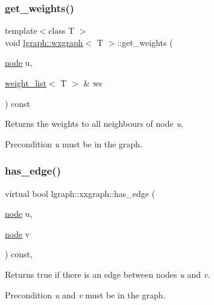 \subsubsection{\texorpdfstring{get\+\_\+weights()}{get\_weights()}\hspace{0.1cm}{\footnotesize\ttfamily [2/2]}}
{\footnotesize\ttfamily template$<$class T $>$ \\
void \hyperlink{classlgraph_1_1wxgraph}{lgraph\+::wxgraph}$<$ T $>$\+::get\+\_\+weights (\begin{DoxyParamCaption}\item[{\hyperlink{namespacelgraph_a397169dd66adf725210a30fb7251773e}{node}}]{u,  }\item[{\hyperlink{namespacelgraph_a1e0fd5ef0a78b2a92da48adbed265cb6}{weight\+\_\+list}$<$ T $>$ \&}]{ws }\end{DoxyParamCaption}) const}



Returns the weights to all neighbours of node {\itshape u}. 

\begin{DoxyPrecond}{Precondition}
{\itshape u} must be in the graph. 
\end{DoxyPrecond}
\mbox{\label{classlgraph_1_1xxgraph_a4e36e9722df020df6ba1dc47b7d9d830}} 
\subsubsection{\texorpdfstring{has\+\_\+edge()}{has\_edge()}}
{\footnotesize\ttfamily virtual bool lgraph\+::xxgraph\+::has\+\_\+edge (\begin{DoxyParamCaption}\item[{\hyperlink{namespacelgraph_a397169dd66adf725210a30fb7251773e}{node}}]{u,  }\item[{\hyperlink{namespacelgraph_a397169dd66adf725210a30fb7251773e}{node}}]{v }\end{DoxyParamCaption}) const\hspace{0.3cm}{\ttfamily [pure virtual]}, {\ttfamily [inherited]}}



Returns true if there is an edge between nodes {\itshape u} and {\itshape v}. 

\begin{DoxyPrecond}{Precondition}
{\itshape u} and {\itshape v} must be in the graph. 
\end{DoxyPrecond}



